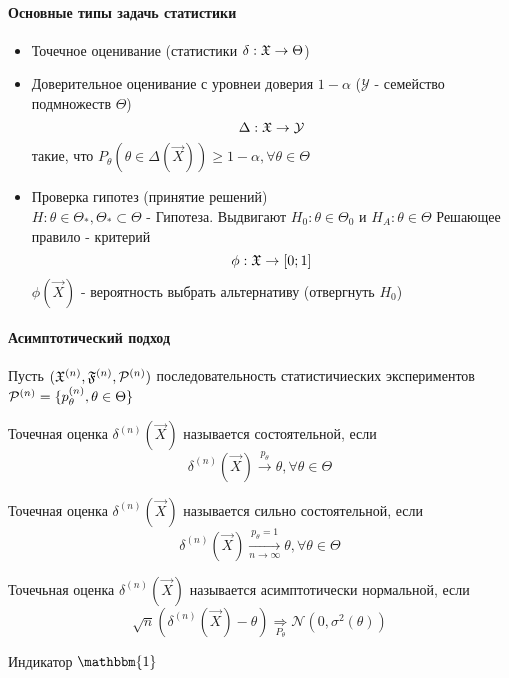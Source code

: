 \documentclass[main.tex]{subfiles}
\begin{document}
\paragraph{Основные типы задачь статистики}
\begin{itemize}
	\item Точечное оценивание (статистики $\delta : \mathfrak{X} \rightarrow \Theta$)
	\item Доверительное оценивание с уровнеи доверия $1-\alpha$ ($\mathcal{Y}$ - семейство подмножеств $\Theta$)
		$$\Delta : \mathfrak{X} \rightarrow \mathcal{Y}$$
	такие, что $P_\theta (\theta \in \Delta (\vec{X})) \geq 1-\alpha, \forall \theta \in \Theta$
	\item Проверка гипотез (принятие решений) \\
	$H:\theta \in \Theta_*, \Theta_* \subset \Theta$ - Гипотеза. Выдвигают $H_0 : \theta \in \Theta_0$ и $H_A : \theta \in \Theta$ Решающее правило - критерий
	$$\phi : \mathfrak{X} \rightarrow [0;1]$$
	$\phi(\vec{X})$ - вероятность выбрать альтернативу (отвергнуть $H_0$)
\end{itemize}

\paragraph{Асимптотический подход}
Пусть $(\mathfrak{X}^{(n)},\mathfrak{F}^{(n)},\mathcal{P}^{(n)})$ последовательность статистичиеских экспериментов
$\mathcal{P}^{(n)}=\{p_\theta^{(n)},\theta \in \Theta\}$

\begin{definition}
	 Точечная оценка $\delta^{(n)}(\vec{X})$ называется состоятельной, если
	 $$\delta^{(n)}(\vec{X}) \xrightarrow{p_\theta} \theta,\forall \theta \in \Theta $$
\end{definition}

\begin{definition}
	Точечная оценка $\delta^{(n)}(\vec{X})$ называется сильно состоятельной, если
	 $$\delta^{(n)}(\vec{X}) \xrightarrow[n \rightarrow \infty]{p_\theta = 1} \theta,\forall \theta \in \Theta $$
\end{definition}

\begin{definition}
	Точечьная оценка $\delta^{(n)}(\vec{X})$ называется асимптотически нормальной, если
	$$\sqrt{n} (\delta^{(n)}(\vec{X}) - \theta) \underset{P_\theta}{\Rightarrow} \mathcal{N}(0,\sigma^2(\theta))$$
\end{definition}
Индикатор $\mathbbm{1}$
\end{document}
